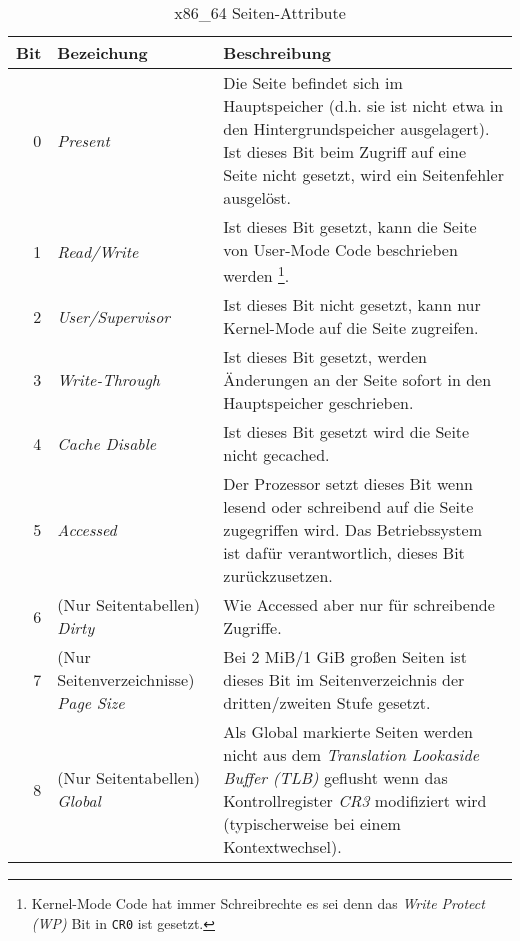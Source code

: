 \begin{table}
  \centering
  \caption{x86\_64 Seiten-Attribute}
  \vspace{10pt}
  \label{tbl:page_table_entry_bits}
  \begin{tabularx}{\linewidth}{rlX}
    \toprule
    Bit & Bezeichung & Beschreibung \\
    \midrule
    0 & \textit{Present} &
    Die Seite befindet sich im Hauptspeicher (d.h. sie ist nicht etwa in den
    Hintergrundspeicher ausgelagert). Ist dieses Bit beim Zugriff auf eine Seite
    nicht gesetzt, wird ein Seitenfehler ausgelöst.\vspace{\baselineskip} \\
    1 & \textit{Read/Write} &
    Ist dieses Bit gesetzt, kann die Seite von User-Mode Code beschrieben werden%
    \footnote{Kernel-Mode Code hat immer Schreibrechte es sei denn das
    \textit{Write Protect (WP)} Bit in \texttt{CR0} ist gesetzt.}.\vspace{\baselineskip}  \\
    2 & \textit{User/Supervisor} &
    Ist dieses Bit nicht gesetzt, kann nur Kernel-Mode auf die Seite zugreifen.\vspace{\baselineskip}  \\
    3 & \textit{Write-Through} &
    Ist dieses Bit gesetzt, werden Änderungen an der Seite sofort in den
    Hauptspeicher geschrieben.\vspace{\baselineskip}  \\
    4 & \textit{Cache Disable} &
    Ist dieses Bit gesetzt wird die Seite nicht gecached.\vspace{\baselineskip} \\
    5 & \textit{Accessed} &
    Der Prozessor setzt dieses Bit wenn lesend oder schreibend auf die Seite
    zugegriffen wird. Das Betriebssystem ist dafür verantwortlich, dieses Bit
    zurückzusetzen.\vspace{\baselineskip}  \\
    6 & (Nur Seitentabellen) \textit{Dirty} &
    Wie Accessed aber nur für schreibende Zugriffe.\vspace{\baselineskip}  \\
    7 & (Nur Seitenverzeichnisse) \textit{Page Size} &
    Bei 2 MiB/1 GiB großen Seiten ist dieses Bit im Seitenverzeichnis der
    dritten/zweiten Stufe gesetzt.\vspace{\baselineskip}  \\
    8 & (Nur Seitentabellen) \textit{Global} &
    Als Global markierte Seiten werden nicht aus
    dem \textit{Translation Lookaside Buffer (TLB)} geflusht wenn das
    Kontrollregister \textit{CR3} modifiziert wird (typischerweise bei einem
    Kontextwechsel).\vspace{\baselineskip} \\
    \bottomrule
  \end{tabularx}
\end{table}

